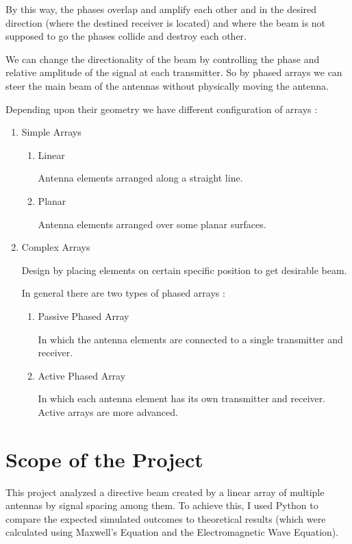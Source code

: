 By this way, the phases overlap and amplify each other and in the desired direction (where the destined receiver is located) and where the beam is not supposed to go the phases collide and destroy each other.

We can change the directionality of the beam by controlling the phase and relative amplitude of the signal at each transmitter. So by phased arrays we can steer the main beam of the antennas without physically moving the antenna.

Depending upon their geometry we have different configuration of arrays \cite{mailloux2005phased}:

\begin{enumerate}

   \item Simple Arrays
      \begin{enumerate}

         \item Linear

            Antenna elements arranged along a straight line.

         \item Planar

            Antenna elements arranged over some planar surfaces.

      \end{enumerate}

   \item Complex Arrays

      Design by placing elements on certain specific position to get desirable beam.
      
      In general there are two types of phased arrays \cite{sylvania1966phased}:

      \begin{enumerate}

         \item Passive Phased Array

            In which the antenna elements are connected to a single transmitter and receiver.

         \item Active Phased Array

            In which each antenna element has its own transmitter and receiver. Active arrays are more advanced.

      \end{enumerate}

\end{enumerate}

\section{Scope of the Project}

This project analyzed a directive beam created by a linear array of multiple antennas by signal spacing among them. 
To achieve this, I used Python to compare the expected simulated outcomes to theoretical results (which were calculated using Maxwell's Equation and the Electromagnetic Wave Equation).
